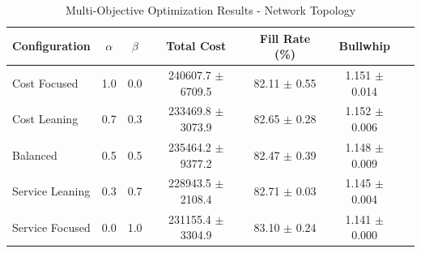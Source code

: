 \begin{table}[htbp]
\centering
\caption{Multi-Objective Optimization Results - Network Topology}
\label{tab:pareto_network}
\begin{tabular}{lcccccc}
\toprule
Configuration & $\alpha$ & $\beta$ & Total Cost & Fill Rate (\%) & Bullwhip \\
\midrule
Cost Focused & 1.0 & 0.0 & 240607.7 $\pm$ 6709.5 & 82.11 $\pm$ 0.55 & 1.151 $\pm$ 0.014 \\
Cost Leaning & 0.7 & 0.3 & 233469.8 $\pm$ 3073.9 & 82.65 $\pm$ 0.28 & 1.152 $\pm$ 0.006 \\
Balanced & 0.5 & 0.5 & 235464.2 $\pm$ 9377.2 & 82.47 $\pm$ 0.39 & 1.148 $\pm$ 0.009 \\
Service Leaning & 0.3 & 0.7 & 228943.5 $\pm$ 2108.4 & 82.71 $\pm$ 0.03 & 1.145 $\pm$ 0.004 \\
Service Focused & 0.0 & 1.0 & 231155.4 $\pm$ 3304.9 & 83.10 $\pm$ 0.24 & 1.141 $\pm$ 0.000 \\
\bottomrule
\end{tabular}
\end{table}